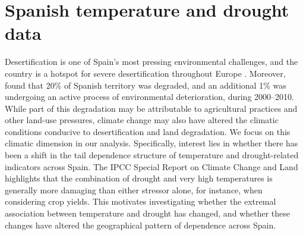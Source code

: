 \documentclass[APA,STIX1COL]{WileyNJD-v2}
\begin{document}
\section{Spanish temperature and drought data}
\label{sec:data}

Desertification is one of Spain's most pressing environmental challenges, and the country is a hotspot for severe desertification throughout Europe \citep{onate2005policy}. Moreover, \citet{SpainDegradation} found that 20\% of Spanish territory was degraded, and an additional 1\% was undergoing an active process of environmental deterioration, during 2000--2010. While part of this degradation may be attributable to agricultural practices and other land-use pressures, climate change may also have altered the climatic conditions conducive to desertification and land degradation. We focus on this climatic dimension in our analysis. Specifically, interest lies in whether there has been a shift in the tail dependence structure of temperature and drought-related indicators across Spain. The IPCC Special Report on Climate Change and Land \citep{IPCC2019Land} highlights that the combination of drought and very high temperatures is generally more damaging than either stressor alone, for instance, when considering crop yields. This motivates investigating whether the extremal association between temperature and drought has changed, and whether these changes have altered the geographical pattern of dependence across Spain.
\end{document}

